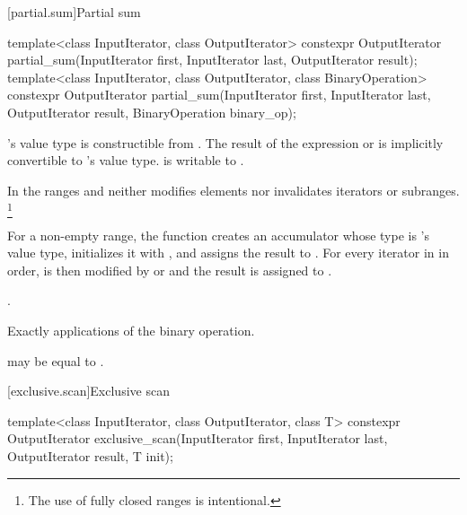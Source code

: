 [partial.sum]{Partial sum}

%
\begin{itemdecl}
template<class InputIterator, class OutputIterator>
  constexpr OutputIterator
    partial_sum(InputIterator first, InputIterator last,
                OutputIterator result);
template<class InputIterator, class OutputIterator, class BinaryOperation>
  constexpr OutputIterator
    partial_sum(InputIterator first, InputIterator last,
                OutputIterator result, BinaryOperation binary_op);
\end{itemdecl}

\begin{itemdescr}
\pnum
\mandates
{}'s value type is constructible from .
The result of the
expression  or 
is implicitly convertible to 's value type.
 is writable to .

\pnum
\expects
In the ranges  and 
 neither modifies elements
nor invalidates iterators or subranges.%
\footnote{The use of fully closed ranges is intentional.}

\pnum
\effects
For a non-empty range,
the function creates an accumulator 
whose type is 's value type,
initializes it with ,
and assigns the result to .
For every iterator  in  in order,
 is then modified by
 or 
and the result is assigned to .

\pnum
\returns
{}.

\pnum
\complexity
Exactly  applications of the binary operation.

\pnum
\remarks
{} may be equal to .
\end{itemdescr}

[exclusive.scan]{Exclusive scan}

%
\begin{itemdecl}
template<class InputIterator, class OutputIterator, class T>
  constexpr OutputIterator
    exclusive_scan(InputIterator first, InputIterator last,
                   OutputIterator result, T init);
\end{itemdecl}

